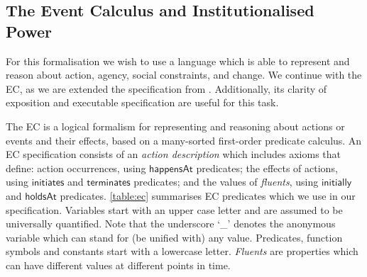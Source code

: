
\subsection{The Event Calculus and Institutionalised Power}

For this formalisation we wish to use a language which is able to represent and reason about action, agency, social constraints, and change. 
We continue with the \ac{EC}, as we are extended the specification from . Additionally, its clarity of exposition and executable specification are useful for this task.

The \ac{EC} is a logical formalism for representing and reasoning about actions or events and their effects, based on a many-sorted first-order predicate calculus. 
An \ac{EC} specification consists of an \emph{action description} which includes axioms that define: action occurrences, using $\mathsf{happensAt}$ predicates; the effects of actions, using $\mathsf{initiates}$ and $\mathsf{terminates}$ predicates; and the values of \emph{fluents}, using $\mathsf{initially}$ and $\mathsf{holdsAt}$ predicates. 
\autoref{table:ec} summarises \ac{EC} predicates which we use in our specification. 
Variables start with an upper case letter and are assumed to be universally quantified. Note that the underscore `\_' denotes
the anonymous variable which can stand for (be unified with) any value. 
Predicates, function symbols and constants start with a lowercase letter. 
\emph{Fluents} are properties which can have different values at different points in time.

